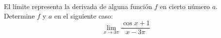 \item El límite representa la derivada de alguna función $f$ en cierto número $a$. Determine $f$ y $a$ en el siguiente caso:
$$\lim_{x \to 3\pi} \frac{\cos x + 1}{x - 3\pi}$$
